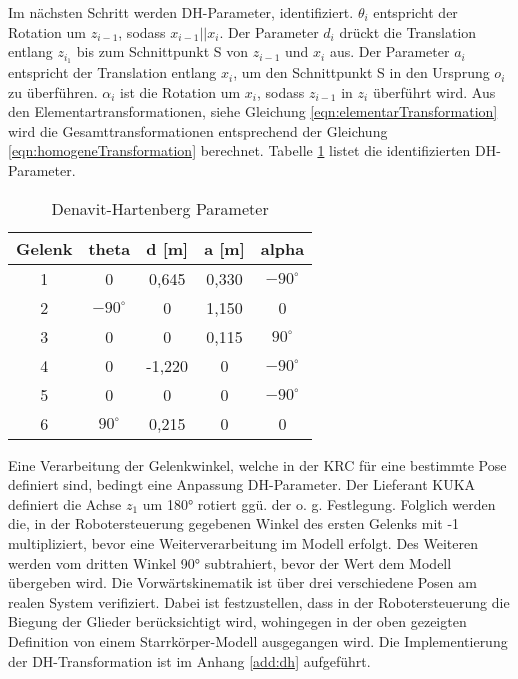 %
Im nächsten Schritt werden DH-Parameter, identifiziert.  $\theta_i$ entspricht der Rotation um $z_{i-1}$, sodass $x_{i-1}||x_i$. Der Parameter $d_i$ drückt die Translation entlang $z_{i_1}$ bis zum Schnittpunkt S von $z_{i-1}$ und $x_i$ aus. Der Parameter $a_i$ entspricht der Translation entlang $x_i$, um den Schnittpunkt S in den Ursprung $o_i$ zu überführen. $\alpha_i$ ist die Rotation um $x_i$, sodass $z_{i-1}$ in $z_i$ überführt wird. Aus den Elementartransformationen, siehe Gleichung \ref{eqn:elementarTransformation} wird die Gesamttransformationen entsprechend der Gleichung \ref{eqn:homogeneTransformation} berechnet. Tabelle \ref{tab:dh} listet die identifizierten DH-Parameter. 
%
\begin{table}[tbph]
	\centering
	\begin{tabular}{|c|c|c|c|c|}
		\hline
		Gelenk & theta & d [m] & a [m] & alpha \\
		\hline
		1& 0 & 0,645 & 0,330 & $-90^\circ$ \\
		\hline
		2& $-90^\circ$ & 0 & 1,150 & 0 \\
		\hline
		3& 0 & 0 & 0,115 & $90^\circ$ \\
		\hline
		4& 0 & -1,220 & 0 & $-90^\circ$ \\
		\hline
		5& 0 & 0 & 0 & $-90^\circ$ \\
		\hline
		6& $90^\circ$ & 0,215 & 0 & 0 \\
		\hline
	\end{tabular}
\caption{Denavit-Hartenberg Parameter}
\label{tab:dh}
\end{table}
%
Eine Verarbeitung der Gelenkwinkel, welche in der KRC für eine bestimmte Pose definiert sind, bedingt eine Anpassung DH-Parameter. Der Lieferant KUKA definiert die Achse $z_{1}$ um 180° rotiert ggü. der o. g. Festlegung. Folglich werden die, in der Robotersteuerung gegebenen Winkel des ersten Gelenks  mit -1 multipliziert, bevor eine Weiterverarbeitung im Modell erfolgt. Des Weiteren werden vom dritten Winkel 90° subtrahiert, bevor der Wert dem Modell übergeben wird. Die Vorwärtskinematik ist über drei verschiedene Posen am realen System verifiziert. Dabei ist festzustellen, dass in der Robotersteuerung die Biegung der Glieder berücksichtigt wird, wohingegen in der oben gezeigten Definition von einem Starrkörper-Modell ausgegangen wird. 
Die Implementierung der DH-Transformation ist im Anhang \ref{add:dh}  aufgeführt. 
%
